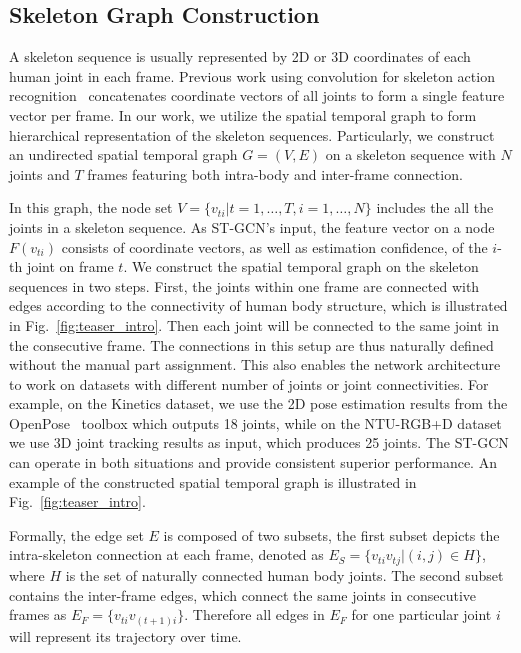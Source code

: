 \documentclass[letterpaper]{article} \usepackage{aaai18}  \usepackage{times}  \usepackage{helvet}  \usepackage{courier}  \usepackage{url}  \usepackage{graphicx}
\begin{document}
\subsection{Skeleton Graph Construction}
\label{sec:graph_construction}
A skeleton sequence is usually represented by 2D or 3D coordinates of each human joint in each frame. Previous work using convolution for skeleton action recognition~\cite{Kim2017CVPRW} concatenates coordinate vectors of all joints to form a single feature vector per frame.
In our work, we utilize the spatial temporal graph to form hierarchical representation of the skeleton sequences. 
Particularly, we construct an undirected spatial temporal graph $ G = (V, E) $ on a skeleton sequence with $ N $ joints and $ T $ frames featuring both intra-body and inter-frame connection.

In this graph, the node set $ V = \{v_{ti} | t = 1,\ldots, T, i=1,\ldots,N\} $ includes the all the joints in a skeleton sequence. 
As ST-GCN's input, the feature vector on a node $F(v_{ti})$ consists of coordinate vectors, as well as estimation confidence, of the $i$-th joint on frame $t$.
We construct the spatial temporal graph on the skeleton sequences in two steps. 
First, the joints within one frame are connected with edges according to the connectivity of human body structure, which is illustrated in Fig.~\ref{fig:teaser_intro}. 
Then each joint will be connected to the same joint in the consecutive frame.
The connections in this setup are thus naturally defined without the manual part assignment. 
This also enables the network architecture to work on datasets with different number of joints or joint connectivities.
For example, on the Kinetics dataset, we use the 2D pose estimation results from the OpenPose~\cite{Cao2017Openpose} toolbox which outputs 18 joints, while on the NTU-RGB+D dataset~\cite{Shahroudy2016CVPR} we use 3D joint tracking results as input, which produces 25 joints.
The ST-GCN can operate in both situations and provide consistent superior performance.
An example of the constructed spatial temporal graph is illustrated in Fig.~\ref{fig:teaser_intro}.

Formally,
the edge set $ E $ is composed of two subsets, the first subset depicts the intra-skeleton connection at each frame, denoted as
$	
E_S = \{v_{ti}v_{tj}| (i, j) \in H\} 
$,
where $ H $ is the set of naturally connected human body joints.
The second subset contains the inter-frame edges, which connect the same joints in consecutive frames as
$
	E_F = \{v_{ti}v_{(t+1) i}\}
$. 
Therefore all edges in $ E_F $ for one particular joint $ i $ will represent its trajectory over time.
\end{document}
